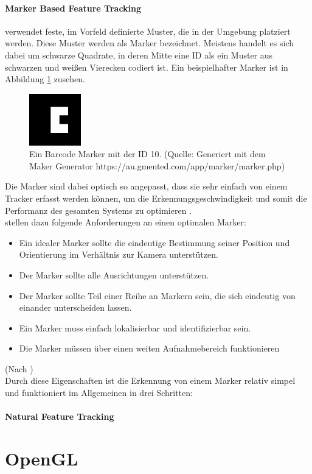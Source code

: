 \paragraph{Marker Based Feature Tracking} verwendet feste, im Vorfeld definierte Muster, die in der Umgebung platziert werden. Diese Muster werden als Marker bezeichnet. Meistens handelt es sich dabei um schwarze Quadrate, in deren Mitte eine ID als ein Muster aus schwarzen und weißen Vierecken codiert ist. Ein beispielhafter Marker ist in Abbildung \ref{fig:barcode-marker} zusehen.
\begin{figure}[h!]
\centering
\includegraphics[width=0.2\textwidth]{Abbildungen/BarcodeMarker3x3-10.png}
\caption[Barcode Marker]{Ein Barcode Marker mit der ID 10. (Quelle: Generiert mit dem  Maker Generator https://au.gmented.com/app/marker/marker.php)}
\label{fig:barcode-marker}
\end{figure}
Die Marker sind dabei optisch so angepasst, dass sie sehr einfach von einem Tracker erfasst werden können, um die Erkennungsgeschwindigkeit und somit die Performanz des gesamten Systems zu optimieren \citep[S. 28]{mehler-bicher:augmented-reality}.\\
\citeauthor{owen:fiducial-marker} stellen dazu folgende Anforderungen an einen optimalen Marker:
\begin{itemize}
\item Ein idealer Marker sollte die eindeutige Bestimmung seiner Position und Orientierung im Verhältnis zur Kamera unterstützen.
\item Der Marker sollte alle Ausrichtungen unterstützen.
\item Der Marker sollte Teil einer Reihe an Markern sein, die sich eindeutig von einander unterscheiden lassen.
\item Ein Marker muss einfach lokalisierbar und identifizierbar sein.
\item Die Marker müssen über einen weiten Aufnahmebereich funktionieren
\end{itemize}
(Nach \citet[S. 2]{owen:fiducial-marker})\\
Durch diese Eigenschaften ist die Erkennung von einem Marker relativ simpel und funktioniert im Allgemeinen in drei Schritten:



\paragraph{Natural Feature Tracking}

\section{OpenGL}\label{OpenGL}